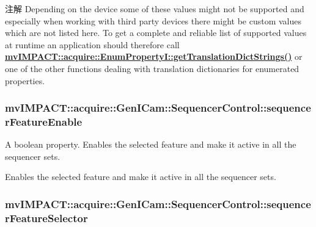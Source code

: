 \begin{DoxyNote}{注解}
Depending on the device some of these values might not be supported and especially when working with third party devices there might be custom values which are not listed here. To get a complete and reliable list of supported values at runtime an application should therefore call {\bfseries \hyperlink{classmv_i_m_p_a_c_t_1_1acquire_1_1_enum_property_i_a0ba6ccbf5ee69784d5d0b537924d26b6}{mv\+I\+M\+P\+A\+C\+T\+::acquire\+::\+Enum\+Property\+I\+::get\+Translation\+Dict\+Strings()}} or one of the other functions dealing with translation dictionaries for enumerated properties. 
\end{DoxyNote}
\hypertarget{classmv_i_m_p_a_c_t_1_1acquire_1_1_gen_i_cam_1_1_sequencer_control_a9f42d8001d6d139d3603d0fe02225a71}{
\subsubsection[{sequencer\+Feature\+Enable}]{ mv\+I\+M\+P\+A\+C\+T\+::acquire\+::\+Gen\+I\+Cam\+::\+Sequencer\+Control\+::sequencer\+Feature\+Enable}}\label{classmv_i_m_p_a_c_t_1_1acquire_1_1_gen_i_cam_1_1_sequencer_control_a9f42d8001d6d139d3603d0fe02225a71}


A boolean property. Enables the selected feature and make it active in all the sequencer sets. 

Enables the selected feature and make it active in all the sequencer sets. \hypertarget{classmv_i_m_p_a_c_t_1_1acquire_1_1_gen_i_cam_1_1_sequencer_control_aa8c6d750c19279e6c4c629b767e60899}{
\subsubsection[{sequencer\+Feature\+Selector}]{ mv\+I\+M\+P\+A\+C\+T\+::acquire\+::\+Gen\+I\+Cam\+::\+Sequencer\+Control\+::sequencer\+Feature\+Selector}}\label{classmv_i_m_p_a_c_t_1_1acquire_1_1_gen_i_cam_1_1_sequencer_control_aa8c6d750c19279e6c4c629b767e60899}


